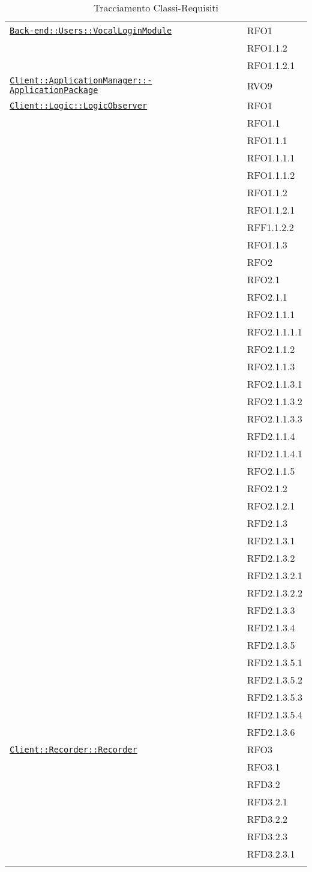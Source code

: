 \begin{longtable}{|>{\centering}m{10cm}|m{3cm}<{\centering}|}
\hyperref[Back-end::Users::VocalLoginModule]{\texttt{Back-end::Users::VocalLoginModule}} & RFO1\\
& RFO1.1.2\\
& RFO1.1.2.1\\ \hline

\hyperref[Client::ApplicationManager::ApplicationPackage]{\texttt{Client::ApplicationManager::-\linebreak ApplicationPackage}} & RVO9\\ \hline

\hyperref[Client::Logic::LogicObserver]{\texttt{Client::Logic::LogicObserver}} & RFO1\\
& RFO1.1\\
& RFO1.1.1\\
& RFO1.1.1.1\\
& RFO1.1.1.2\\
& RFO1.1.2\\
& RFO1.1.2.1\\
& RFF1.1.2.2\\
& RFO1.1.3\\
& RFO2\\
& RFO2.1\\
& RFO2.1.1\\
& RFO2.1.1.1\\
& RFO2.1.1.1.1\\
& RFO2.1.1.2\\
& RFO2.1.1.3\\
& RFO2.1.1.3.1\\
& RFO2.1.1.3.2\\
& RFO2.1.1.3.3\\
& RFD2.1.1.4\\
& RFD2.1.1.4.1\\
& RFO2.1.1.5\\
& RFO2.1.2\\
& RFO2.1.2.1\\
& RFD2.1.3\\
& RFD2.1.3.1\\
& RFD2.1.3.2\\
& RFD2.1.3.2.1\\
& RFD2.1.3.2.2\\
& RFD2.1.3.3\\
& RFD2.1.3.4\\
& RFD2.1.3.5\\
& RFD2.1.3.5.1\\
& RFD2.1.3.5.2\\
& RFD2.1.3.5.3\\
& RFD2.1.3.5.4\\
& RFD2.1.3.6\\ \hline

\hyperref[Client::Recorder::Recorder]{\texttt{Client::Recorder::Recorder}} & RFO3\\
& RFO3.1\\
& RFD3.2\\
& RFD3.2.1\\
& RFD3.2.2\\
& RFD3.2.3\\
& RFD3.2.3.1\\ \hline

\caption[Tracciamento Classi-Requisiti]{Tracciamento Classi-Requisiti}
\label{tabella:class-requi}
\end{longtable}
\clearpage
